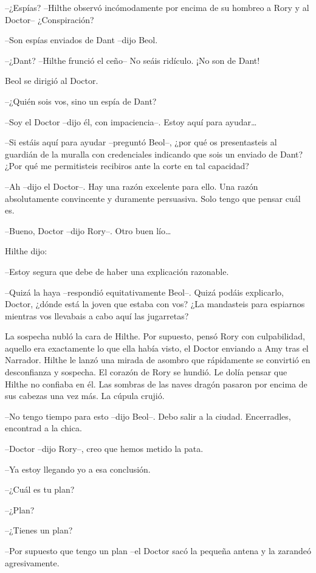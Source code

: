 {--¿Espías? --Hilthe observó incómodamente por encima de su hombreo a
Rory y al Doctor-- ¿Conspiración?}

{--Son espías enviados de Dant --dijo Beol.}

{--¿Dant? --Hilthe frunció el ceño-- No seáis ridículo. ¡No son de
Dant!}

{Beol se dirigió al Doctor.}

{--¿Quién sois vos, sino un espía de Dant?}

{--Soy el Doctor --dijo él, con impaciencia--. Estoy aquí para
	ayudar\ldots{}}

{--Si estáis aquí para ayudar --preguntó Beol--, ¿por qué os
	presentasteis al guardián de la muralla con credenciales indicando que
	sois un enviado de Dant? ¿Por qué me permitisteis recibiros ante la
corte en tal capacidad?}

{--Ah --dijo el Doctor--. Hay una razón excelente para ello. Una razón
	absolutamente convincente y duramente persuasiva. Solo tengo que pensar
cuál es.}

{--Bueno, Doctor --dijo Rory--. Otro buen lío\ldots{}}

{Hilthe dijo:}

{--Estoy segura que debe de haber una explicación razonable.}

{--Quizá la haya --respondió equitativamente Beol--. Quizá podáis
	explicarlo, Doctor, ¿dónde está la joven que estaba con vos? ¿La
	mandasteis para espiarnos mientras vos llevabais a cabo aquí las
jugarretas?}

{La sospecha nubló la cara de Hilthe. Por supuesto, pensó Rory con
	culpabilidad, aquello era exactamente lo que ella había visto, el Doctor
	enviando a Amy tras el Narrador. Hilthe le lanzó una mirada de asombro
	que rápidamente se convirtió en desconfianza y sospecha. El corazón de
	Rory se hundió. Le dolía pensar que Hilthe no confiaba en él. Las
	sombras de las naves dragón pasaron por encima de sus cabezas una vez
más. La cúpula crujió.}

{--No tengo tiempo para esto --dijo Beol--. Debo salir a la ciudad.
Encerradles, encontrad a la chica.}

{--Doctor --dijo Rory--, creo que hemos metido la pata.}

{--Ya estoy llegando yo a esa conclusión.}

{--¿Cuál es tu plan?}

{--¿Plan?}

{--¿Tienes un plan?}

{--Por supuesto que tengo un plan --el Doctor sacó la pequeña antena y
la zarandeó agresivamente.}

